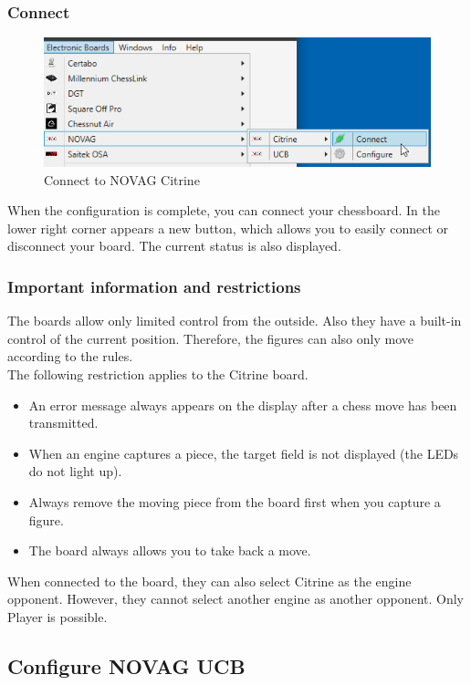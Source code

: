 \documentclass[11pt,a4paper]{article}
\begin{document}
\subsubsection{Connect}
\begin{figure}[H]
	\centering
	\includegraphics[scale=0.8]{NovagCitrine3.png}
	\caption{Connect to NOVAG Citrine}
	\label{fig:NovagCitrine3}
\end{figure}
When the configuration is complete, you can connect your chessboard.
In the lower right corner appears a new button, which allows you to easily connect or disconnect your board. The current status is also displayed.

\subsubsection{Important information and restrictions} \label{InformationNovagCitrine}
The boards allow only limited control from the outside. Also they have a built-in control of the current position. Therefore, the figures can also only move according to the rules.\\
The following restriction applies to the Citrine board.

\begin{itemize}
	\item An error message always appears on the display after a chess move has been transmitted.
	\item When an engine captures a piece, the target field is not displayed (the LEDs do not light up).
	\item Always remove the moving piece from the board first when you capture a figure.
	\item The board always allows you to take back a move.
\end{itemize}

When connected to the board, they can also select Citrine as the engine opponent.
However, they cannot select another engine as another opponent. Only Player is possible.

\subsection{Configure NOVAG UCB} \label{ConfigureNovagUCB}
\end{document}
